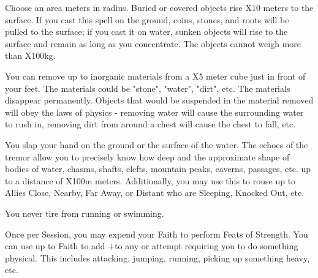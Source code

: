 {\LITURGY [
  Name= Dredge,
  Link= umwansh-liturgy-dredge,
  Paradigm= Mind ,
  Save=  N ,
  Duration= Concentration ,
  Counter=  n/a  ,
  Keywords= None ,
  Target=   Close or Nearby area
]



Choose an area \DICE meters in radius.  Buried or covered objects rise \DICE X10 meters to the surface.  If you cast this spell on the ground, coins, stones, and roots will be pulled to the surface; if you cast it on water, sunken objects will rise to the surface and remain as long as you concentrate.  The objects cannot weigh more than \DICE X100kg. 

\LITURGY [
  Name= Excavate,
  Link=umwansh-liturgy-excavate,
  Paradigm= Elements ,
  Save=  N ,
  Duration= 0 ,
  Counter=  n/a  ,
  Keywords= None ,
  Target=   Close or Nearby area
]



You can remove up to \DICE inorganic materials from a \DICE X5 meter cube just in front of your feet.  The materials could be "stone", "water", "dirt", etc. The materials disappear permanently. Objects that would be suspended in the material removed will obey the laws of physics - removing water will cause the surrounding water to rush in, removing dirt from around a chest will cause the chest to fall, etc.

\LITURGY [
  Name= Sound the Deeps,
  Link=umwansh-liturgy-sound the deeps,
  Paradigm= Force ,
  Save=  N ,
  Duration= 0 ,
  Counter=  n/a  ,
  Keywords= None ,
  Target=   Close (ground or water)
]



You slap your hand on the ground or the surface of the water.  The echoes of the tremor allow you to precisely know how deep and the approximate shape of bodies of water, chasms, shafts, clefts, mountain peaks, caverns, passages, etc.  up to a distance of \DICE X100m meters.  Additionally, you may use this to rouse up to \DICE Allies Close, Nearby, Far Away, or Distant who are Sleeping, Knocked Out, etc. 


\GOD[
Name=Xbalanque and Hunahpu,
Link=small-god-xbalanque and hunahpu,
GodOf=Twin Gods of Trials,
Holy=two ears of dried corn (hung from a belt or around the neck)
]


You never tire from running or swimming.  


Once per Session, you may expend your Faith to perform Feats of Strength.  You can use up to \LVL Faith to add +\SUMDICE to any \RO or \RB attempt requiring you to do something physical.  This includes attacking, jumping, running, picking up something heavy, etc.


}
